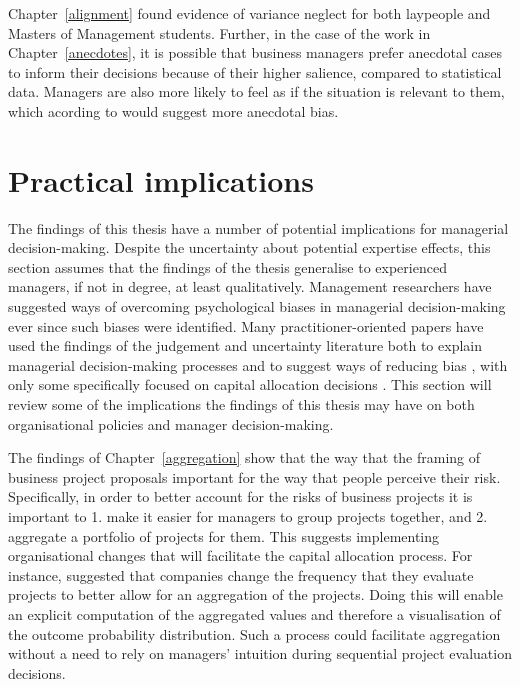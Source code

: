 \documentclass[a4paper, nobind, dvipsnames]{templates/ociamthesis}
\theoremstyle{definition}
\theoremstyle{definition}
\theoremstyle{definition}
\theoremstyle{definition}
\theoremstyle{remark}
\begin{document}
Chapter~\ref{alignment} found evidence of variance neglect for both laypeople
and Masters of Management students. Further, in the case of the work in
Chapter~\ref{anecdotes}, it is possible that business managers prefer anecdotal
cases to inform their decisions because of their higher salience, compared to
statistical data. Managers are also more likely to feel as if the situation is
relevant to them, which acording to \textcite{freling2020} would suggest more anecdotal
bias.

\hypertarget{practical-implications}{%
\section{Practical implications}\label{practical-implications}}

The findings of this thesis have a number of potential implications for
managerial decision-making. Despite the uncertainty about potential expertise
effects, this section assumes that the findings of the thesis generalise to
experienced managers, if not in degree, at least qualitatively. Management
researchers have suggested ways of overcoming psychological biases in managerial
decision-making ever since such biases were identified. Many
practitioner-oriented papers have used the findings of the judgement and
uncertainty literature both to explain managerial decision-making processes and
to suggest ways of reducing bias \autocite{lovallo2014,koller2012,hall2012,courtney1997,courtney2013,sibony2017}, with only some specifically focused
on capital allocation decisions \autocite{birshan2013}. This section will review some of
the implications the findings of this thesis may have on both organisational
policies and manager decision-making.

The findings of Chapter~\ref{aggregation} show that the way that the framing of
business project proposals important for the way that people perceive their
risk. Specifically, in order to better account for the risks of business
projects it is important to 1. make it easier for managers to group projects
together, and 2. aggregate a portfolio of projects for them. This suggests
implementing organisational changes that will facilitate the capital allocation
process. For instance, \textcite{lovallo2020} suggested that companies change the
frequency that they evaluate projects to better allow for an aggregation of the
projects. Doing this will enable an explicit computation of the aggregated
values and therefore a visualisation of the outcome probability distribution.
Such a process could facilitate aggregation without a need to rely on managers'
intuition during sequential project evaluation decisions.
\end{document}
